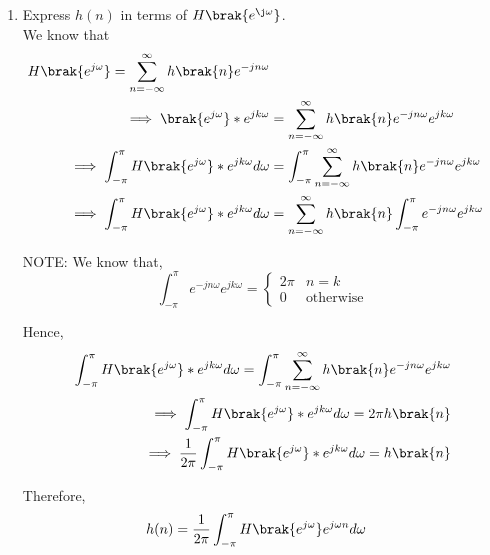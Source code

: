 \documentclass[journal,12pt,twocolumn]{IEEEtran}
\renewcommand\thesection{\arabic{section}}
\begin{document}
\begin{enumerate}[label=\thesection.\arabic*]
\item Express $h(n)$ in terms of $H\brak{e^{\j \omega}}$.
\\\solution 
We know that\\
\begin{align}
	H\brak{e^{j\omega}}=\sum _{n= -\infty}^{\infty} h\brak{n} e^{-jn\omega }
	\\\implies\brak{e^{j\omega}}*e^{jk\omega} &= \sum _{n= -\infty}^{\infty} h\brak{n} e^{-jn\omega} e^{jk\omega}
	\\\implies\int_{-\pi}^{\pi} H\brak{e^{j\omega}}*e^{jk\omega}d\omega &= \int_{-\pi}^{\pi}\sum _{n= -\infty}^{\infty} h\brak{n} e^{-jn\omega} e^{jk\omega}
	\\\implies\int_{-\pi}^{\pi} H\brak{e^{j\omega}}*e^{jk\omega}d\omega &= \sum _{n= -\infty}^{\infty} h\brak{n}\int_{-\pi}^{\pi} e^{-jn\omega} e^{jk\omega}
\end{align}

NOTE:
We know that,
\begin{equation}
	\int_{-\pi}^{\pi} e^{-jn\omega} e^{jk\omega} 
	=
	\begin{cases}
		2\pi & n = k
		\\
		0 & \text{otherwise}
		\end{cases}
\end{equation}	


Hence,
\begin{align}
	\int_{-\pi}^{\pi} H\brak{e^{j\omega}}*e^{jk\omega}d\omega = \int_{-\pi}^{\pi}\sum _{n= -\infty}^{\infty} h\brak{n} e^{-jn\omega} e^{jk\omega}
	\\\implies \int_{-\pi}^{\pi} H\brak{e^{j\omega}}*e^{jk\omega}d\omega = 2\pi h\brak{n}
	\\\implies \frac{1}{2\pi} \int_{-\pi}^{\pi} H\brak{e^{j\omega}}*e^{jk\omega}d\omega = h\brak{n}
\end{align}
 
Therefore,\\
\begin{align}
	h(n) &= \frac{1}{2\pi}\int_{-\pi}^{\pi}H\brak{e^{j\omega}}e^{j\omega n}d\omega
\end{align}
\end{enumerate}
\end{document}
